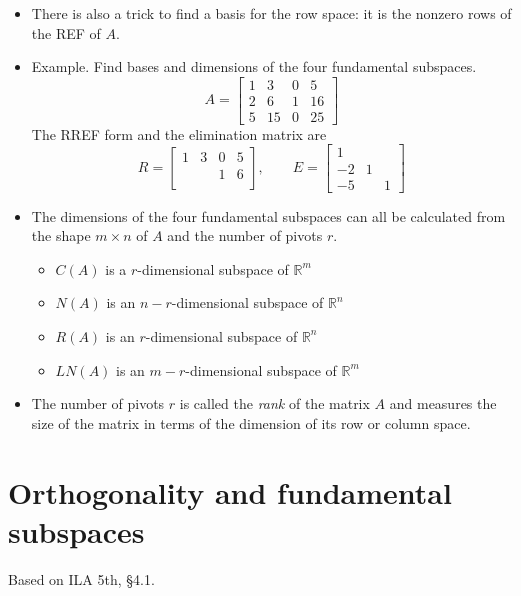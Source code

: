 \documentclass[11pt,oneside]{amsbook}
\newcommand{\RR}{\mathbb R}
\theoremstyle{definition}
\theoremstyle{plain}
\theoremstyle{definition}
\theoremstyle{remark}
\numberwithin{equation}{section}
\numberwithin{figure}{section}
\begin{document}
\begin{itemize}
\item There is also a trick to find a basis for the row space: it is the nonzero rows of the REF of $A$.
\item Example. Find bases and dimensions of the four fundamental subspaces.
  \[A=\begin{bmatrix}
      1&3&0&5\\2&6&1&16\\5&15&0&25
    \end{bmatrix}
  \]
  The RREF form and the elimination matrix are
  \[R=\begin{bmatrix}
      1&3&0&5\\&&1&6\\&
    \end{bmatrix},\qquad
    E=\begin{bmatrix}
      1&&\\-2&1&\\-5&&1
    \end{bmatrix}
  \]
\item The dimensions of the four fundamental subspaces can all be calculated from the shape $m\times n$ of $A$ and the number of pivots $r$.
  \begin{itemize}
  \item $C(A)$ is a $r$-dimensional subspace of $\RR^m$
  \item $N(A)$ is an $n-r$-dimensional subspace of $\RR^n$
  \item $R(A)$ is an $r$-dimensional subspace of $\RR^n$
  \item $LN(A)$ is an $m-r$-dimensional subspace of $\RR^m$
  \end{itemize}
\item The number of pivots $r$ is called the \emph{rank} of the matrix $A$ and measures the size of the matrix in terms of the dimension of its row or column space.
\end{itemize}

\newpage
\section{Orthogonality and fundamental subspaces}

Based on ILA 5th, \S 4.1.
\end{document}
